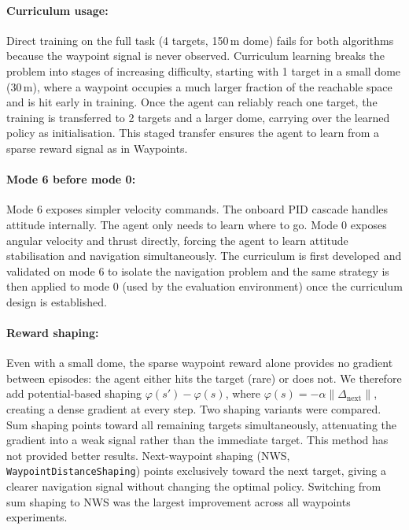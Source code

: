 \documentclass[11pt,a4paper]{article}
\begin{document}
\paragraph{Curriculum usage:}
Direct training on the full task (4 targets, 150\,m dome) fails for both algorithms because the waypoint signal is never observed. Curriculum learning breaks the problem into stages of increasing difficulty, starting with 1 target in a small dome (30\,m), where a waypoint occupies a much larger fraction of the reachable space and is hit early in training. Once the agent can reliably reach one target, the training is transferred to 2 targets and a larger dome, carrying over the learned policy as initialisation. This staged transfer ensures the agent to learn from a sparse reward signal as in Waypoints.

\paragraph{Mode 6 before mode 0:}
Mode 6 exposes simpler velocity commands. The onboard PID cascade handles attitude internally. The agent only needs to learn where to go. Mode 0 exposes angular velocity and thrust directly, forcing the agent to learn attitude stabilisation and navigation simultaneously. The curriculum is first developed and validated on mode 6 to isolate the navigation problem and the same strategy is then applied to mode 0 (used by the evaluation environment) once the curriculum design is established.

\paragraph{Reward shaping:}
Even with a small dome, the sparse waypoint reward alone provides no gradient between episodes: the agent either hits the target (rare) or does not. We therefore add potential-based shaping $\varphi(s') - \varphi(s)$, where $\varphi(s) = -\alpha \|\Delta_{\text{next}}\|$, creating a dense gradient at every step. Two shaping variants were compared. Sum shaping points toward all remaining targets simultaneously, attenuating the gradient into a weak signal rather than the immediate target. This method has not provided better results. Next-waypoint shaping (NWS, \texttt{WaypointDistanceShaping}) points exclusively toward the next target, giving a clearer navigation signal without changing the optimal policy. Switching from sum shaping to NWS was the largest improvement across all waypoints experiments.
\end{document}
